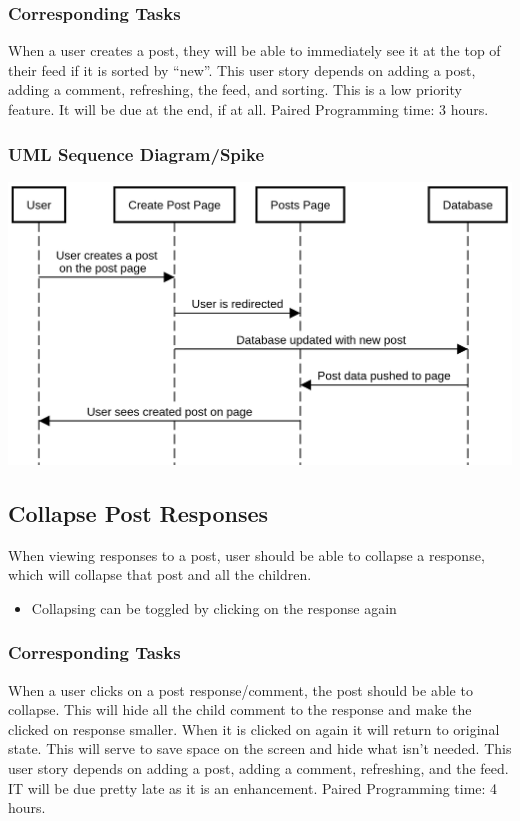 \documentclass[12pt]{article}
\begin{document}
\subsubsection{Corresponding Tasks}
	When a user creates a post, they will be able to immediately see it at the top of their feed if it is sorted by “new”.  This user story depends on adding a post, adding a comment, refreshing, the feed, and sorting.  This is a low priority feature.  It will be due at the end, if at all.  Paired Programming time: 3 hours.
\subsubsection{UML Sequence Diagram/Spike}
\includegraphics[scale=0.5]{img/view_newly_created_post.png}\linebreak

\subsection{Collapse Post Responses}
When viewing responses to a post, user should be able to collapse a response,
which will collapse that post and all the children.
\begin{itemize}
  \item Collapsing can be toggled by clicking on the response again
\end{itemize}
\subsubsection{Corresponding Tasks}
	When a user clicks on a post response/comment, the post should be able to collapse.  This will hide all the child comment to the response and make the clicked on response smaller.  When it is clicked on again it will return to original state.  This will serve to save space on the screen and hide what isn’t needed.  This user story depends on adding a post, adding a comment, refreshing, and the feed.  IT will be due pretty late as it is an enhancement.  Paired Programming time: 4 hours.
\end{document}
